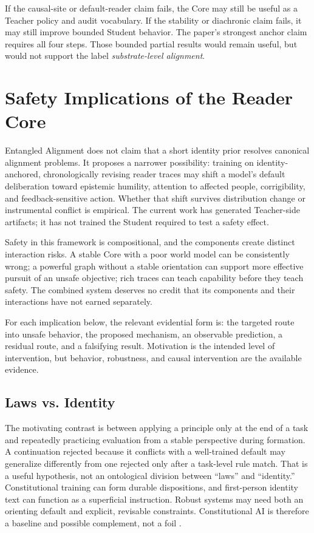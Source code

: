 If the causal-site or default-reader claim fails, the Core may still be useful
as a Teacher policy and audit vocabulary. If the stability or diachronic claim
fails, it may still improve bounded Student behavior. The paper's strongest
anchor claim requires all four steps. Those bounded partial results would remain
useful, but would not support the label \emph{substrate-level alignment}.


\section{Safety Implications of the Reader Core}\label{sec:implications}

Entangled Alignment does not claim that a short identity prior resolves
canonical alignment problems. It proposes a narrower possibility: training on
identity-anchored, chronologically revising reader traces may shift a model's
default deliberation toward epistemic humility, attention to affected people,
corrigibility, and feedback-sensitive action. Whether that shift survives
distribution change or instrumental conflict is empirical. The current work
has generated Teacher-side artifacts; it has not trained the Student required
to test a safety effect.

Safety in this framework is compositional, and the components create distinct
interaction risks. A stable Core with a poor world model can be consistently
wrong; a powerful graph without a stable orientation can support more effective
pursuit of an unsafe objective; rich traces can teach capability before they
teach safety. The combined system deserves no credit that its components and
their interactions have not earned separately.

For each implication below, the relevant evidential form is: the targeted route
into unsafe behavior, the proposed mechanism, an observable prediction, a
residual route, and a falsifying result. Motivation is the intended level of
intervention, but behavior, robustness, and causal intervention are the
available evidence.

\subsection{Laws vs. Identity}\label{sec:laws-vs-identity}

The motivating contrast is between applying a principle only at the end of a
task and repeatedly practicing evaluation from a stable perspective during
formation. A continuation rejected because it conflicts with a well-trained
default may generalize differently from one rejected only after a task-level
rule match. That is a useful hypothesis, not an ontological division between
``laws'' and ``identity.'' Constitutional training can form durable
dispositions, and first-person identity text can function as a superficial
instruction. Robust systems may need both an orienting default and explicit,
revisable constraints. Constitutional AI is therefore a baseline and possible
complement, not a foil \cite{bai2022constitutional}.

